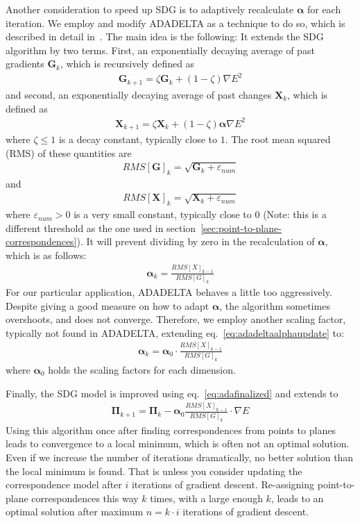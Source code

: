 \documentclass[5p]{elsarticle}
\renewcommand{\vec}[1]{\mathbf{#1}}
\renewcommand{\epsilon}{\varepsilon}
\begin{document}
Another consideration to speed up SDG is to adaptively recalculate $\boldsymbol\alpha$ for each iteration. 
We employ and modify ADADELTA as a technique to do so, which is described in detail in~\cite{zeiler2012adadelta}.
The main idea is the following:
It extends the SDG algorithm by two terms.
First, an exponentially decaying average of past gradients $\vec{G}_k$, which is recursively defined as
\begin{align}
    \vec{G}_{k+1} = \zeta \vec{G}_{k} + (1 - \zeta) {\nabla E}^2
\end{align}
and second, an exponentially decaying average of past changes $\vec{X}_k$, which is defined as
\begin{align}
    \vec{X}_{k+1} = \zeta \vec{X}_{k} + (1 - \zeta) {\boldsymbol\alpha \nabla E}^2
\end{align}
where $\zeta \leq 1$ is a decay constant, typically close to $1$.
The root mean squared (RMS) of these quantities are
\begin{align}
    RMS[\vec{G}]_{k} = \sqrt{\vec{G}_{k} + \epsilon_{num}}
\end{align}
and 
\begin{align}
    RMS[\vec{X}]_{k} = \sqrt{\vec{X}_{k} + \epsilon_{num}}
\end{align}
where $\epsilon_{num} > 0$ is a very small constant, typically close to $0$ (Note: this is a different threshold as the one used in section~\ref{sec:point-to-plane-correspondences}).
It will prevent dividing by zero in the recalculation of $\boldsymbol\alpha$, which is as follows:
\begin{align}
    \boldsymbol\alpha_{k} = \frac{RMS[X]_{k-1}}{RMS[G]_{k}}
    \label{eq:adadeltaalphaupdate}
\end{align} 
For our particular application, ADADELTA behaves a little too aggressively.
Despite giving a good measure on how to adapt $\boldsymbol\alpha$, the algorithm sometimes overshoots, and does not converge.
Therefore, we employ another scaling factor, typically not found in ADADELTA, extending eq.~\eqref{eq:adadeltaalphaupdate} to:
\begin{align}
    \boldsymbol\alpha_{k} = \boldsymbol\alpha_0 \cdot \frac{RMS[X]_{k-1}}{RMS[G]_{k}}
    \label{eq:adafinalized}
\end{align} 
where $\boldsymbol\alpha_0 $ holds the scaling factors for each dimension.

Finally, the SDG model is improved using eq.~\eqref{eq:adafinalized} and extends to 
\begin{align}
    \vec{\Pi}_{k+1} = \vec{\Pi}_{k} - \boldsymbol\alpha_0  \frac{RMS[X]_{k-1}}{RMS[G]_{k}} \cdot \nabla E
\end{align}
Using this algorithm once after finding correspondences from points to planes leads to convergence to a local minimum, which is often not an optimal solution.
Even if we increase the number of iterations dramatically, no better solution than the local minimum is found.
That is unless you consider updating the correspondence model after $i$ iterations of gradient descent.
Re-assigning point-to-plane correspondences this way $k$ times, with a large enough $k$, leads to an optimal solution after maximum $n = k\cdot i$ iterations of gradient descent.
\end{document}
